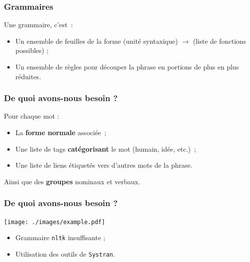 \documentclass[12pt]{beamer}
\begin{document}
\begin{frame}
 \frametitle{Grammaires}
 Une grammaire, c'est~:
 \begin{itemize}
  \item Un ensemble de feuilles de la forme (unité syntaxique) $\rightarrow$ (liste de fonctions possibles) ;
  \item Un ensemble de règles pour découper la phrase en portions de plus en plus réduites.
 \end{itemize}
 
\end{frame}

%  
%  


\begin{frame}
 \frametitle{De quoi avons-nous besoin ?}
 
 Pour chaque mot :
  \begin{itemize}
  \item La \textbf{forme normale} associée~;
  \item Une liste de tags \textbf{catégorisant} le mot (humain, idée, etc.)~;
  \item Une liste de liens étiquetés vers d'autres mots de la phrase.
 \end{itemize}
 
 Ainsi que des \textbf{groupes} nominaux et verbaux.
 

\end{frame}

\begin{frame}
 \frametitle{De quoi avons-nous besoin ?}
 
  \texttt{[image: ./images/example.pdf]}
 
 \pause
 
 \begin{itemize}
  \item Grammaire \texttt{nltk} insuffisante ;
  \item Utilisation des outils de \texttt{Systran}.
 \end{itemize} 
 
 
\end{frame}
\end{document}
